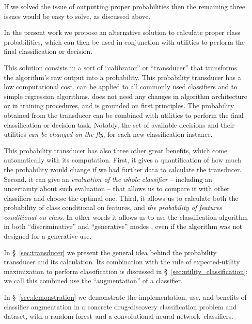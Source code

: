\documentclass[a4paper,12pt,%
onecolumn,oneside,article,%
british%
]{memoir}
\renewcommand*{\|}[1][]{\nonscript\:#1\vert\nonscript\:\mathopen{}}
\newcommand*{\sect}{\S}%
\newcommand*{\RF}{random forest}
\newcommand*{\CNN}{convolutional neural network}
\begin{document}
If we solved the issue of outputting proper probabilities then the remaining three issues would be easy to solve, as discussed above.

\bigskip

In the present work we propose an alternative solution to calculate proper class probabilities, which can then be used in conjunction with utilities to perform the final classification or decision.

This solution consists in a sort of \enquote{calibrator} or \enquote{transducer} that transforms the algorithm's raw output into a probability. This probability transducer has a low computational cost, can be applied to all commonly used classifiers and to simple regression algorithms, does not need any changes in algorithm architecture or in training procedures, and is grounded on first principles. The probability obtained from the transducer can be combined with utilities to perform the final classification or decision task. Notably, the set of available decisions and their utilities \emph{can be changed on the fly}, for each new classification instance.


This probability transducer has also three other great benefits, which come automatically with its computation. First, it gives a quantification of how much the probability would change if we had further data to calculate the transducer. Second, it can give an \emph{evaluation of the whole classifier} -- including an uncertainty about such evaluation -- that allows us to compare it with other classifiers and choose the optimal one. Third, it allows us to calculate both the probability of class conditional on features, and \emph{the probability of features conditional on class}. In other words it allows us to use the classification algorithm in both \enquote{discriminative} and \enquote{generative} modes \autocites[\sect~21.2.3]{russelletal1995_r2022}[\sect~8.6]{murphy2012}, even if the algorithm was not designed for a generative use.

In \sect~\ref{sec:transducer} we present the general idea behind the probability transducer and its calculation. Its combination with the rule of expected-utility maximization to perform classification is discussed in \sect~\ref{sec:utility_classification}; we call this combined use the \enquote{augmentation} of a classifier.

In \sect~\ref{sec:demonstration} we demonstrate the implementation, use, and benefits of classifier augmentation in a concrete drug-discovery classification problem and dataset, with a \RF\ and a \CNN\ classifiers.
\end{document}
